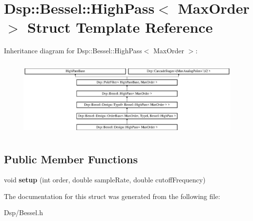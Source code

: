 \hypertarget{structDsp_1_1Bessel_1_1HighPass}{\section{Dsp\-:\-:Bessel\-:\-:High\-Pass$<$ Max\-Order $>$ Struct Template Reference}
\label{structDsp_1_1Bessel_1_1HighPass}
}
Inheritance diagram for Dsp\-:\-:Bessel\-:\-:High\-Pass$<$ Max\-Order $>$\-:\begin{figure}[H]
\begin{center}
\leavevmode
\includegraphics[height=3.952941cm]{structDsp_1_1Bessel_1_1HighPass}
\end{center}
\end{figure}
\subsection*{Public Member Functions}
\begin{DoxyCompactItemize}
\item 
\hypertarget{structDsp_1_1Bessel_1_1HighPass_a9f691ba758f9815c432d1850ffd8169b}{void {\bfseries setup} (int order, double sample\-Rate, double cutoff\-Frequency)}\label{structDsp_1_1Bessel_1_1HighPass_a9f691ba758f9815c432d1850ffd8169b}

\end{DoxyCompactItemize}


The documentation for this struct was generated from the following file\-:\begin{DoxyCompactItemize}
\item 
Dsp/Bessel.\-h\end{DoxyCompactItemize}
